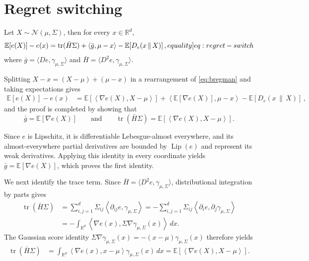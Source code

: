 \documentclass[12pt,cleveref]{jmlr}
\renewenvironment{proof}[1][\proofname]
{\par\noindent{\bfseries\upshape #1\ }}
{\jmlrQED}
\newcommand{\eqlabel}[1]{\label[equality]{#1}}
\newcommand{\R}{\mathbb R}
\newcommand{\E}{\mathbb E}
\newcommand{\N}{\mathcal N}
\newcommand{\tr}{\operatorname{tr}}
\newcommand{\Lip}{\operatorname{Lip}}
\newcommand{\1}{\mathbf 1}
\newcommand{\ip}[2]{\left\langle #1,#2\right\rangle}
\begin{document}
\section{Regret switching}
\label{app:regret-switch}
\begin{lemma}
    \label{lem:regret-switch}
    Let $X\sim\N(\mu,\Sigma)$, then for every $x\in\R^d$,
    \begin{align}
        \E[e(X)]-e(x)
        =\tr(\bar{H}\Sigma)+\ip{\bar{g}}{\mu-x}-\E[D_e(x\,\|\,X)]\,,
        \eqlabel{eq:regret-switch}
    \end{align}
    where $\bar{g}=\langle De,\gamma_{\mu,\Sigma}\rangle$ and
    $\bar{H}=\langle D^2e,\gamma_{\mu,\Sigma}\rangle$.
\end{lemma}
\begin{proof}
    Splitting $X-x=(X-\mu)+(\mu-x)$ in a rearrangement of \cref{eq:bregman} and taking expectations gives
    \begin{align}
        \E[e(X)]-e(x)
        & =
        \E\left[\ip{\nabla e(X)}{X-\mu}\right]
        +
        \ip{\E[\nabla e(X)]}{\mu-x}
        -
        \E[D_e(x\,\|\,X)]\,,
    \end{align}
    and the proof is completed by showing that
    \[
        \bar{g}=\E[\nabla e(X)]
        \qquad\text{and}\qquad
        \tr(\bar{H}\Sigma)=\E[\ip{\nabla e(X)}{X-\mu}].
    \]

    Since $e$ is Lipschitz, it is differentiable Lebesgue-almost everywhere,
    and its almost-everywhere partial derivatives are bounded by $\Lip(e)$
    and represent its weak derivatives.
    Applying this identity in every coordinate yields $\bar{g}=\E[\nabla e(X)]$,
    which proves the first identity.

    We next identify the trace term. Since
    $\bar{H}=\langle D^2e,\gamma_{\mu,\Sigma}\rangle$,
    distributional integration by parts gives
    \begin{align}
        \tr(\bar{H}\Sigma)
        & =
        \sum_{i,j=1}^d
        \Sigma_{ij}
        \left\langle
        \partial_{ij}e,
        \gamma_{\mu,\Sigma}
        \right\rangle
        =
        -\sum_{i,j=1}^d
        \Sigma_{ij}
        \left\langle
        \partial_i e,
        \partial_j\gamma_{\mu,\Sigma}
        \right\rangle
        \\
        & =
        -\int_{\R^d}
        \left\langle
        \nabla e(x),
        \Sigma\nabla\gamma_{\mu,\Sigma}(x)
        \right\rangle
        \,dx.
    \end{align}
    The Gaussian score identity
    $\Sigma\nabla\gamma_{\mu,\Sigma}(x)
    =
    -(x-\mu)\gamma_{\mu,\Sigma}(x)$
    therefore yields
    \begin{align}
        \tr(\bar{H}\Sigma)
        & =
        \int_{\R^d}
        \left\langle
        \nabla e(x),
        x-\mu
        \right\rangle
        \gamma_{\mu,\Sigma}(x)\,dx
        =
        \E\left[
            \left\langle
            \nabla e(X),
            X-\mu
            \right\rangle
        \right].
    \end{align}
\end{proof}
\end{document}
